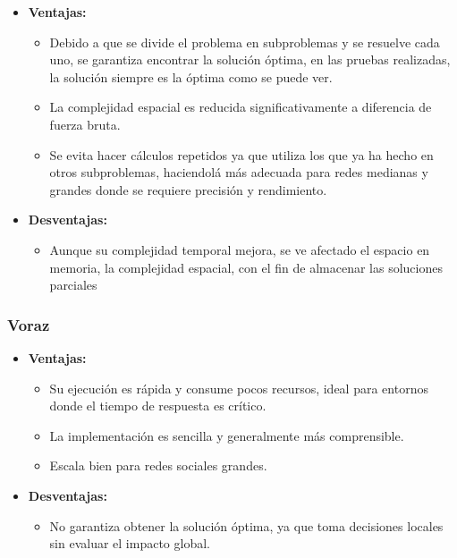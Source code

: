 \documentclass[11pt,letter]{article}
\begin{document}
    \begin{itemize}
        \item \textbf{Ventajas:}
        \begin{itemize}
            \item  Debido a que se divide el problema en subproblemas y se resuelve cada uno, se garantiza encontrar la solución óptima, en las pruebas realizadas, la solución siempre es la óptima como se puede ver.
            \item  La complejidad espacial es reducida significativamente a diferencia de fuerza bruta.
            \item Se evita hacer cálculos repetidos ya que utiliza los que ya ha hecho en otros subproblemas, haciendolá más adecuada para redes medianas y grandes donde se requiere precisión y rendimiento.
        \end{itemize}
        \item \textbf{Desventajas:}
        \begin{itemize}
            \item  Aunque su complejidad temporal mejora, se ve afectado el espacio en memoria, la complejidad espacial, con el fin de almacenar las soluciones parciales
        \end{itemize}
    \end{itemize}

    \subsubsection{Voraz}

    \begin{itemize}
        \item \textbf{Ventajas:}
        \begin{itemize}
            \item  Su ejecución es rápida y consume pocos recursos, ideal para entornos donde el tiempo de respuesta es crítico.
            \item  La implementación es sencilla y generalmente más comprensible.
            \item Escala bien para redes sociales grandes.
        \end{itemize}
        \item \textbf{Desventajas:}
        \begin{itemize}
            \item  No garantiza obtener la solución óptima, ya que toma decisiones locales sin evaluar el impacto global.
        \end{itemize}
    \end{itemize}
\end{document}
